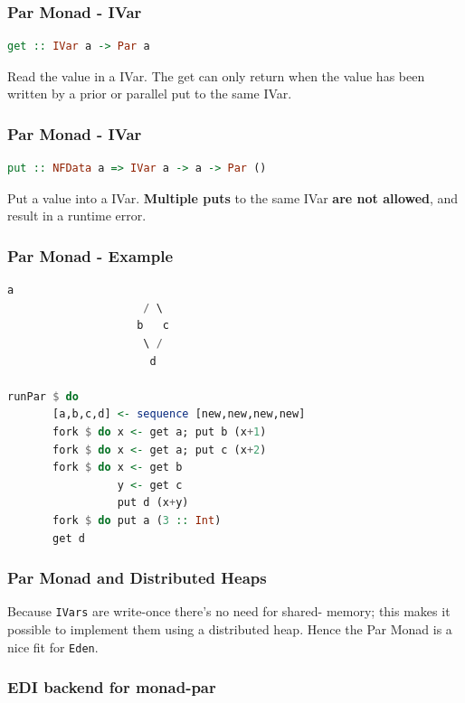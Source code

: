 \documentclass[12pt, danish]{beamer}
\begin{document}
\begin{frame}[fragile]
  \frametitle{Par Monad - IVar}
  \begin{lstlisting}[language=Haskell]
get :: IVar a -> Par a  
  \end{lstlisting}

  Read the value in a IVar. The get can only return when the value 
  has been written by a prior or parallel put to the same IVar.
  
\end{frame}

\begin{frame}[fragile]
  \frametitle{Par Monad - IVar}
  \begin{lstlisting}[language=Haskell]
put :: NFData a => IVar a -> a -> Par ()
  \end{lstlisting} 
    
  Put a value into a IVar. \textbf{Multiple puts} to the same IVar
  \textbf{are not  allowed}, and result in a runtime error.
    
\end{frame}

\begin{frame}[fragile]
  \frametitle{Par Monad - Example}
  \begin{lstlisting}[language=Haskell]
                      a
                     / \  
                    b   c
                     \ /
                      d
  
runPar $ do
       [a,b,c,d] <- sequence [new,new,new,new]
       fork $ do x <- get a; put b (x+1)
       fork $ do x <- get a; put c (x+2)
       fork $ do x <- get b
                 y <- get c 
                 put d (x+y)
       fork $ do put a (3 :: Int)
       get d
  \end{lstlisting}
\end{frame}

\begin{frame}
  \frametitle{Par Monad and Distributed Heaps}

  Because \texttt{IVars} are write-once there's no need for shared-
  memory; this makes it possible to implement them using a distributed
  heap. Hence the Par Monad is a nice fit for \texttt{Eden}.

\end{frame}

\begin{frame}
\frametitle{EDI backend for monad-par}
\end{frame}
\end{document}
